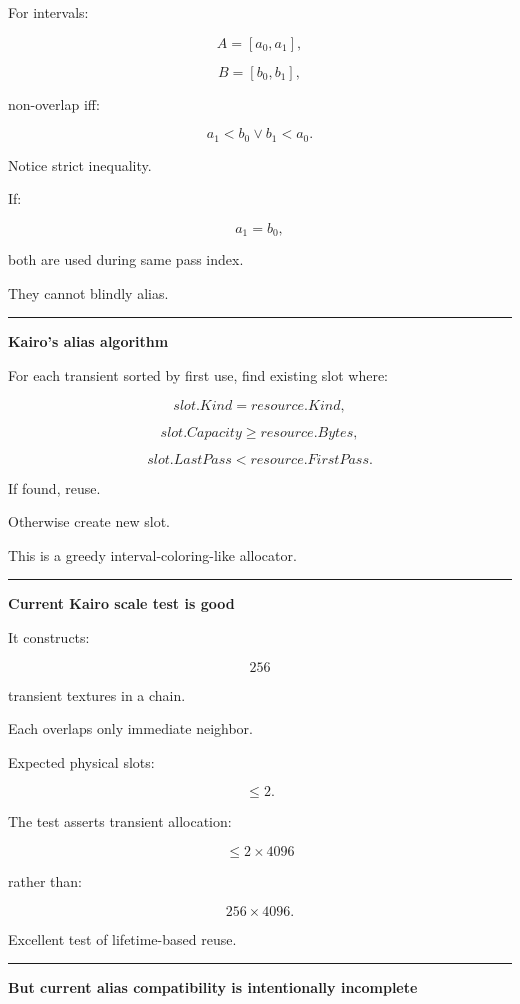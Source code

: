 For intervals:

\[
A=[a_0,a_1],
\]

\[
B=[b_0,b_1],
\]

non-overlap iff:

\[
\boxed{
a_1<b_0
\lor
b_1<a_0.
}
\]

Notice strict inequality.

If:

\[
a_1=b_0,
\]

both are used during same pass index.

They cannot blindly alias.

\begin{center}\rule{0.5\linewidth}{0.5pt}\end{center}

\textbf{Kairo's alias algorithm}

For each transient sorted by first use, find existing slot where:

\[
slot.Kind=resource.Kind,
\]

\[
slot.Capacity\ge resource.Bytes,
\]

\[
slot.LastPass<resource.FirstPass.
\]

If found, reuse.

Otherwise create new slot.

This is a greedy interval-coloring-like allocator.

\begin{center}\rule{0.5\linewidth}{0.5pt}\end{center}

\textbf{Current Kairo scale test is good}

It constructs:

\[
256
\]

transient textures in a chain.

Each overlaps only immediate neighbor.

Expected physical slots:

\[
\le2.
\]

The test asserts transient allocation:

\[
\le
2\times4096
\]

rather than:

\[
256\times4096.
\]

Excellent test of lifetime-based reuse.

\begin{center}\rule{0.5\linewidth}{0.5pt}\end{center}

\textbf{But current alias compatibility is intentionally incomplete}

